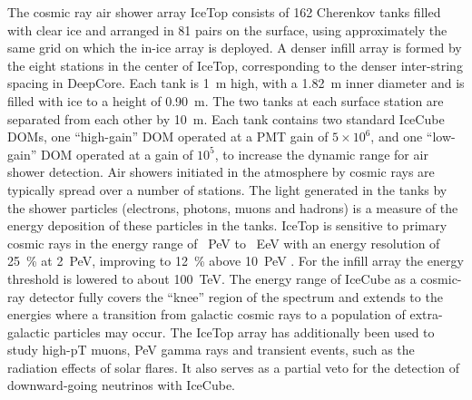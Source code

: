 The cosmic ray air shower array IceTop \cite{ICECUBE:IceTop} consists
of \num{162} Cherenkov tanks filled with clear ice and arranged in
\num{81} pairs on the
surface, using approximately the same grid on which the in-ice
array is deployed. A denser infill array is formed by the eight
stations in the center of IceTop, corresponding to the denser
inter-string spacing
in DeepCore. Each tank is \SI{1}{\meter} high, with a \SI{1.82}{\meter} inner diameter and is
filled with ice to a height of \SI{0.90}{\meter}.  The two tanks at each surface station are separated from
each other by \SI{10}{\meter}. Each tank contains two standard IceCube
DOMs, one ``high-gain'' DOM operated at a PMT gain of $5 \times 10^{6}$, and one
``low-gain'' DOM operated at a gain of $10^{5}$, to increase the dynamic range for air shower detection. Air showers initiated in the atmosphere by cosmic rays are typically
spread over a number of stations. The light generated in the tanks by the
shower particles (electrons, photons, muons and hadrons) is a measure of
the energy deposition of these particles in the tanks. IceTop is sensitive to
primary cosmic rays in the energy range of \SI{}{PeV} to \SI{}{EeV}
with an energy resolution of \SI{25}{\%} at \SI{2}{PeV}, improving to
\SI{12}{\%} above \SI{10}{PeV} \cite{IT:measurement}. For the infill
array the energy threshold is lowered to about \SI{100}{TeV}. The energy range of IceCube as a cosmic-ray detector fully covers the ``knee'' region of the spectrum and extends to the energies where a transition from galactic cosmic rays to a population of extra-galactic
particles may occur. The IceTop array has additionally been used to study high-pT muons, PeV gamma rays and transient events, such as the radiation effects of solar ﬂares. It also serves as a partial veto for the detection of downward-going neutrinos with IceCube.  




